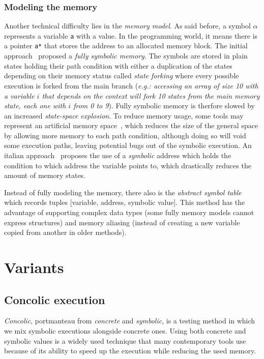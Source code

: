 \documentclass[11pt]{IEEEtran}
\begin{document}
      \subsubsection{Modeling the memory}
        Another technical difficulty lies in the \emph{memory model}. As said before, a symbol $\alpha$ represents a variable \texttt{a} with a value. In the programming world, it means there is a pointer \texttt{a*} that stores the address to an allocated memory block. The initial approach~\cite{newapproach} proposed a \emph{fully symbolic memory}. The symbols are stored in plain states holding their path condition with either a duplication of the states depending on their memory status called \emph{state forking} where every possible execution is forked from the main branch (\emph{e.g.: accessing an array of size 10 with a variable $i$ that depends on the context will fork 10 states from the main memory state, each one with $i$ from 0 to 9}). Fully symbolic memory is therfore slowed by an increased \emph{state-space explosion}. To reduce memory usage, some tools may represent an artificial memory space~\cite{5635129}, which reduces the size of the general space by allowing more memory to each path condition, although doing so will void some execution paths, leaving potential bugs out of the symbolic execution. An italian approach~\cite{memorymodelpointers} proposes the use of a \emph{symbolic} address which holds the condition to which address the variable points to, which drastically reduces the amount of memory states.

        Instead of fully modeling the memory, there also is the \emph{abstract symbol table}~\cite{memorytablemodel} which records tuples [variable, address, symbolic value]. This method has the advantage of supporting complex data types (some fully memory models cannot express structures) and memory aliasing (instead of creating a new variable copied from another in older methods).
  \section{Variants}
    \subsection{Concolic execution}
    \label{subsec:concolicExecution}
    	\emph{Concolic}, portmanteau from \emph{concrete} and \emph{symbolic}, is a testing method in which we mix symbolic executions alongside concrete ones. Using both concrete and symbolic values is a widely used technique that many contemporary tools use because of its ability to speed up the execution while reducing the used memory.\\
\end{document}
